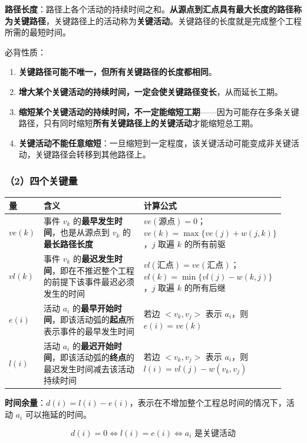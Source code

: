 \documentclass[11pt,openany,UTF8]{ctexbook}
\begin{document}
\textbf{路径长度}：路径上各个活动的持续时间之和。\textbf{从源点到汇点具有最大长度的路径称为关键路径}，关键路径上的活动称为\textbf{关键活动}。关键路径的长度就是完成整个工程所需的最短时间。

必背性质：

\begin{enumerate}
\item \textbf{关键路径可能不唯一，但所有关键路径的长度都相同}。
\item \textbf{增大某个关键活动的持续时间，一定会使关键路径变长}，从而延长工期。
\item \textbf{缩短某个关键活动的持续时间，不一定能缩短工期}——因为可能存在多条关键路径，只有同时缩短\textbf{所有关键路径上的关键活动}才能缩短总工期。
\item \textbf{关键活动不能任意缩短}：一旦缩短到一定程度，该关键活动可能变成非关键活动，关键路径会转移到其他路径上。
\end{enumerate}
\subsubsection{（2）四个关键量}

\begingroup\small\setlength{\tabcolsep}{4.0pt}
\begin{longtable}{@{}L{0.1050\linewidth}L{0.5713\linewidth}L{0.2521\linewidth}@{}}
\toprule
\textbf{量} & \textbf{含义} & \textbf{计算公式} \\
\midrule
\endhead
$ve(k)$ & 事件 $v_k$ 的\textbf{最早发生时间}，也是从源点到 $v_k$ 的\textbf{最长路径长度} & $ve(\text{源点})=0$；$ve(k)=\max\{ve(j)+w(j,k)\}$，$j$ 取遍 $k$ 的所有前驱 \\
$vl(k)$ & 事件 $v_k$ 的\textbf{最迟发生时间}，即在不推迟整个工程的前提下该事件最迟必须发生的时间 & $vl(\text{汇点})=ve(\text{汇点})$；$vl(k)=\min\{vl(j)-w(k,j)\}$，$j$ 取遍 $k$ 的所有后继 \\
$e(i)$ & 活动 $a_i$ 的\textbf{最早开始时间}，即该活动弧的\textbf{起点}所表示事件的最早发生时间 & 若边 $<v_k,v_j>$ 表示 $a_i$，则 $e(i)=ve(k)$ \\
$l(i)$ & 活动 $a_i$ 的\textbf{最迟开始时间}，即该活动弧的\textbf{终点}的最迟发生时间减去该活动持续时间 & 若边 $<v_k,v_j>$ 表示 $a_i$，则 $l(i)=vl(j)-w(v_k,v_j)$ \\
\bottomrule
\end{longtable}
\endgroup

\textbf{时间余量}：$d(i)=l(i)-e(i)$，表示在不增加整个工程总时间的情况下，活动 $a_i$ 可以拖延的时间。

\[d(i)=0 \iff l(i)=e(i) \iff a_i \text{ 是关键活动}\]
\end{document}
